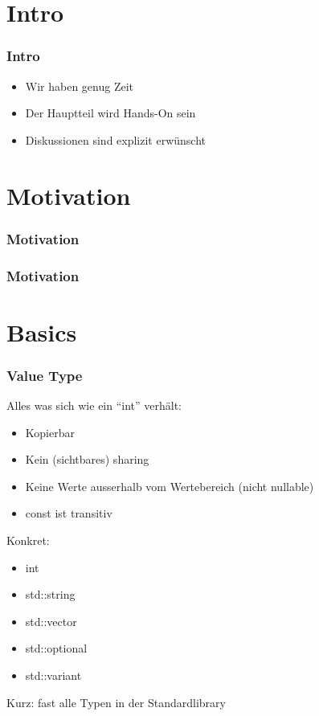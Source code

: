 \section{Intro}

\begin{frame}[fragile]
	\frametitle{Intro}
	\begin{itemize}
		\item Wir haben genug Zeit
		\item Der Hauptteil wird Hands-On sein
		\item Diskussionen sind explizit erwünscht
	\end{itemize}
\end{frame}

\section{Motivation}
\begin{frame}[fragile,t]
	\frametitle{Motivation}
\end{frame}

\begin{frame}[fragile,t]
	\frametitle{Motivation}
\end{frame}

\section{Basics}

\begin{frame}[fragile]
	\frametitle{Value Type}
	Alles was sich wie ein \enquote{int} verhält:
	\begin{itemize}
		\item Kopierbar
		\item Kein (sichtbares) sharing
		\item Keine Werte ausserhalb vom Wertebereich (nicht nullable)
		\item const ist transitiv
	\end{itemize}
	\pause{}
	Konkret:
	\begin{itemize}
		\item int
		\item std::string
		\item std::vector
		\item std::optional
		\item std::variant
	\end{itemize}
	\pause{}
	Kurz: fast alle Typen in der Standardlibrary
\end{frame}

